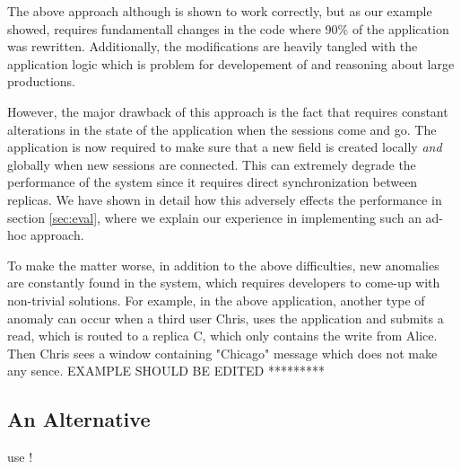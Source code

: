 The above approach although is shown to work correctly, but as our
example showed, requires fundamentall changes in the code where 90\% of
the application was rewritten. Additionally, the modifications are
heavily tangled with the application logic which is problem for
developement of and reasoning about large
productions.

However, the major drawback of this approach is the fact that requires
constant alterations in the state of the application when the sessions
come and go. The application is now required to make
sure that a new field is created locally \emph{and} globally when 
new sessions are connected. This can extremely degrade the performance
of the system since it requires direct synchronization between replicas.
We have shown in detail how this adversely effects the performance in section
\ref{sec:eval}, where  we explain our experience in implementing
such an ad-hoc approach.

To make the matter worse, in addition to the above difficulties,
new anomalies are constantly found in the system, which requires
developers to come-up with non-trivial solutions. For example, in the
above application, another type of anomaly can occur when a third user
Chris, uses the application and submits a read, which is routed to a
replica C, which only contains the write from Alice. Then Chris sees a
window containing "Chicago" message which does not make any sence.
{EXAMPLE SHOULD
BE EDITED *********}



%
%
\subsection{An Alternative}
use \tool!





















\newpage





















